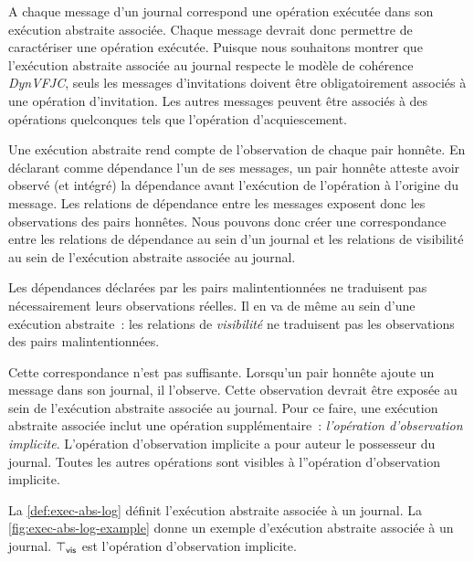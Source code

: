 A chaque message d'un journal correspond une opération exécutée dans son exécution abstraite associée.
Chaque message devrait donc permettre de caractériser une opération exécutée.
Puisque nous souhaitons montrer que l'exécution abstraite associée au journal respecte le modèle de cohérence \emph{DynVFJC}, seuls les messages d'invitations doivent être obligatoirement associés à une opération d'invitation.
Les autres messages peuvent être associés à des opérations quelconques tels que l'opération d'acquiescement.

Une exécution abstraite rend compte de l'observation de chaque pair honnête.
En déclarant comme dépendance l'un de ses messages, un pair honnête atteste avoir observé (et intégré) la dépendance avant l'exécution de l'opération à l'origine du message.
Les relations de dépendance entre les messages exposent donc les observations des pairs honnêtes.
Nous pouvons donc créer une correspondance entre les relations de dépendance au sein d'un journal et les relations de visibilité au sein de l'exécution abstraite associée au journal.

Les dépendances déclarées par les pairs malintentionnées ne traduisent pas nécessairement leurs observations réelles.
Il en va de même au sein d'une exécution abstraite~: les relations de \emph{visibilité} ne traduisent pas les observations des pairs malintentionnées.

Cette correspondance n'est pas suffisante.
Lorsqu'un pair honnête ajoute un message dans son journal, il l'observe.
Cette observation devrait être exposée au sein de l'exécution abstraite associée au journal.
Pour ce faire, une exécution abstraite associée inclut une opération supplémentaire~: \emph{l'opération d'observation implicite}.
L'opération d'observation implicite a pour auteur le possesseur du journal.
Toutes les autres opérations sont visibles à l''opération d'observation implicite.

La \autoref{def:exec-abs-log} définit l'exécution abstraite associée à un journal.
La \autoref{fig:exec-abs-log-example} donne un exemple d'exécution abstraite associée à un journal.
$\top_{\operatorname{\mathsf{vis}}}$ est l'opération d'observation implicite.

